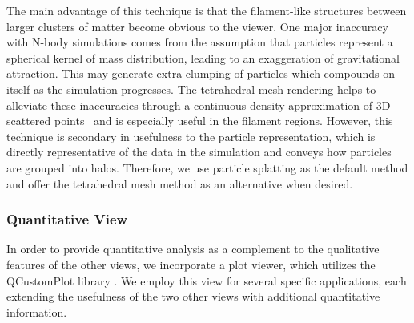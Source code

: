 The main advantage of this technique is that the filament-like structures between larger clusters of matter become obvious to the viewer. One major inaccuracy with N-body simulations comes from the assumption that particles represent a spherical kernel of mass distribution, leading to an exaggeration of gravitational attraction. This may generate extra clumping of particles which compounds on itself as the simulation progresses. The tetrahedral mesh rendering helps to alleviate these inaccuracies through a continuous density approximation of 3D scattered points~\cite{bachthaler2008continuous} and is especially useful in the filament regions. However, this technique is secondary in usefulness to the particle representation, which is directly representative of the data in the simulation and conveys how particles are grouped into halos. Therefore, we use particle splatting as the default method and offer the tetrahedral mesh method as an alternative when desired.

\subsubsection{Quantitative View}
In order to provide quantitative analysis as a complement to the qualitative features of the other views, we incorporate a plot viewer, which utilizes the QCustomPlot library \cite{QCustomPlot}. We employ this view for several specific applications, each extending the usefulness of the two other views with additional quantitative information.

